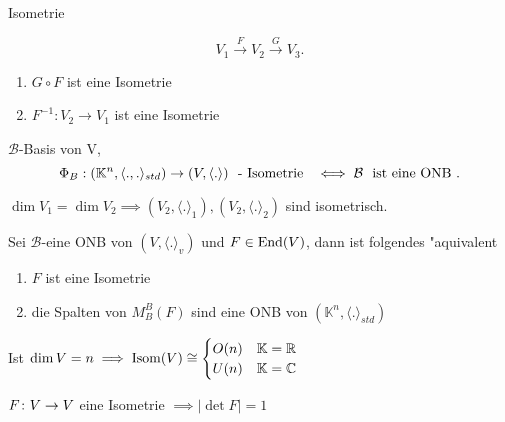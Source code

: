 \documentclass[class=article, crop=false]{standalone}
\begin{document}
\begin{zettel}{Isometrie}
\begin{remark}
\[
    V_1 \stackrel{F}{\to} V_2 \stackrel{G}{\to} V_3
.\]
\begin{enumerate}
    \item $G \circ  F$ ist eine Isometrie
    \item $F^{-1}: V_2 \to  V_1$ ist eine Isometrie
\end{enumerate}

\end{remark}

\begin{corollary}
    $\mathcal{B}$-Basis von V, 
\[
    \Phi_B : (\mathbb{K}^n, \langle.,.\rangle_{std})  \to (V, \langle .\rangle) \tx{ - Isometrie }  \iff \mathcal{B} \tx{ ist eine ONB} 
.\]
\end{corollary}

\begin{corollary}
$\dim V_1 = \dim V_2 \implies  (V_2, \langle .\rangle_1), (V_2, \langle .\rangle_2)$  sind isometrisch.
\end{corollary}

\begin{theorem}[7.5]
    Sei $\mathcal{B}$-eine ONB von $(V, \langle .\rangle_v)$ und $F \in  \operatorname{End}(V)$, dann ist folgendes "aquivalent
    \begin{enumerate}
        \item $F$ ist eine Isometrie
        \item die Spalten von $M_B^B (F) $ sind eine ONB von $( \mathbb{K}^n, \langle .\rangle_{std})$ 
    \end{enumerate}
\end{theorem}

\begin{corollary}
Ist $\dim V =n \implies \operatorname{Isom} (V) \cong \begin{cases} O (n) & \mathbb{K} = \mathbb{R} \\ U (n) & \mathbb{K} = \mathbb{C} \end{cases} $ 
\end{corollary}

\begin{corollary}
$F \colon V\to V$ eine Isometrie $\implies |\det F| =1$ 
\end{corollary}
\end{zettel}
\end{document}
